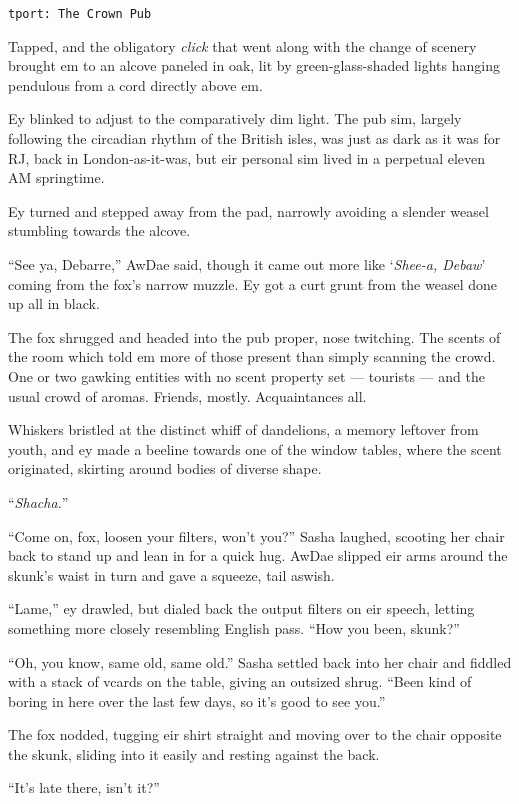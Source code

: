 \texttt{tport:\ The\ Crown\ Pub}

Tapped, and the obligatory \emph{click} that went along with the change of scenery brought em to an alcove paneled in oak, lit by green-glass-shaded lights hanging pendulous from a cord directly above em.

Ey blinked to adjust to the comparatively dim light. The pub sim, largely following the circadian rhythm of the British isles, was just as dark as it was for RJ, back in London-as-it-was, but eir personal sim lived in a perpetual eleven AM springtime.

Ey turned and stepped away from the pad, narrowly avoiding a slender weasel stumbling towards the alcove.

``See ya, Debarre,'' AwDae said, though it came out more like `\emph{Shee-a, Debaw}' coming from the fox's narrow muzzle. Ey got a curt grunt from the weasel done up all in black.

The fox shrugged and headed into the pub proper, nose twitching. The scents of the room which told em more of those present than simply scanning the crowd. One or two gawking entities with no scent property set — tourists — and the usual crowd of aromas. Friends, mostly. Acquaintances all.

Whiskers bristled at the distinct whiff of dandelions, a memory leftover from youth, and ey made a beeline towards one of the window tables, where the scent originated, skirting around bodies of diverse shape.

``\emph{Shacha.}''

``Come on, fox, loosen your filters, won't you?'' Sasha laughed, scooting her chair back to stand up and lean in for a quick hug. AwDae slipped eir arms around the skunk's waist in turn and gave a squeeze, tail aswish.

``Lame,'' ey drawled, but dialed back the output filters on eir speech, letting something more closely resembling English pass. ``How you been, skunk?''

``Oh, you know, same old, same old.'' Sasha settled back into her chair and fiddled with a stack of vcards on the table, giving an outsized shrug. ``Been kind of boring in here over the last few days, so it's good to see you.''

The fox nodded, tugging eir shirt straight and moving over to the chair opposite the skunk, sliding into it easily and resting against the back.

``It's late there, isn't it?''

